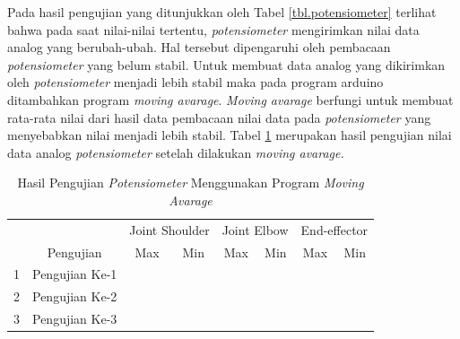 Pada hasil pengujian yang ditunjukkan oleh Tabel \ref{tbl.potensiometer} terlihat bahwa pada saat nilai-nilai tertentu, \textit{potensiometer}  mengirimkan nilai data analog yang berubah-ubah. Hal tersebut dipengaruhi oleh pembacaan \textit{potensiometer} yang belum stabil. Untuk membuat data analog yang dikirimkan oleh \textit{potensiometer} menjadi lebih stabil maka pada program arduino ditambahkan program \textit{moving avarage}. \textit{Moving avarage} berfungi untuk membuat rata-rata nilai dari hasil data pembacaan nilai data pada \textit{potensiometer} yang menyebabkan nilai menjadi lebih stabil. Tabel \ref{tbl.potensiometer2} merupakan hasil pengujian nilai data analog \textit{potensiometer} setelah dilakukan \textit{moving avarage.}

\begin{table}[H]
	\centering
	\caption{Hasil Pengujian \textit{Potensiometer} Menggunakan Program \textit{Moving Avarage}}
	\label{tbl.potensiometer2}
	\begin{tabular}{|c|c|c|c|c|c|c|c|}
		\hline
		\rowcolor[HTML]{9B9B9B} 
		\cellcolor[HTML]{9B9B9B}                     & \cellcolor[HTML]{9B9B9B}                            & \multicolumn{2}{c|}{\cellcolor[HTML]{9B9B9B}Joint Shoulder} & \multicolumn{2}{c|}{\cellcolor[HTML]{9B9B9B}Joint Elbow} & \multicolumn{2}{c|}{\cellcolor[HTML]{9B9B9B}End-effector} \\ \cline{3-8} 
		\rowcolor[HTML]{9B9B9B} 
		\multirow{-2}{*}{\cellcolor[HTML]{9B9B9B}No} & \multirow{-2}{*}{\cellcolor[HTML]{9B9B9B}Pengujian} & Max                          & Min                          & Max                         & Min                        & Max                         & Min                         \\ \hline
		1                                            & Pengujian Ke-1                                      &                              &                              &                             &                            &                             &                             \\ \hline
		2                                            & Pengujian Ke-2                                      &                              &                              &                             &                            &                             &                             \\ \hline
		3                                            & Pengujian Ke-3                                      &                              &                              &                             &                            &                             &                             \\ \hline

\end{tabular}
\end{table}
